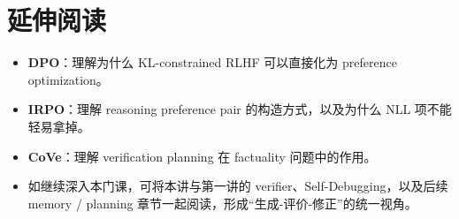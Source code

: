 \documentclass[a4paper]{article}
\begin{document}
\section{延伸阅读}

\begin{itemize}
\item \textbf{DPO}：理解为什么 KL-constrained RLHF 可以直接化为 preference optimization。
\item \textbf{IRPO}：理解 reasoning preference pair 的构造方式，以及为什么 NLL 项不能轻易拿掉。
\item \textbf{CoVe}：理解 verification planning 在 factuality 问题中的作用。
\item 如继续深入本门课，可将本讲与第一讲的 verifier、Self-Debugging，以及后续 memory / planning 章节一起阅读，形成“生成-评价-修正”的统一视角。
\end{itemize}
\end{document}
